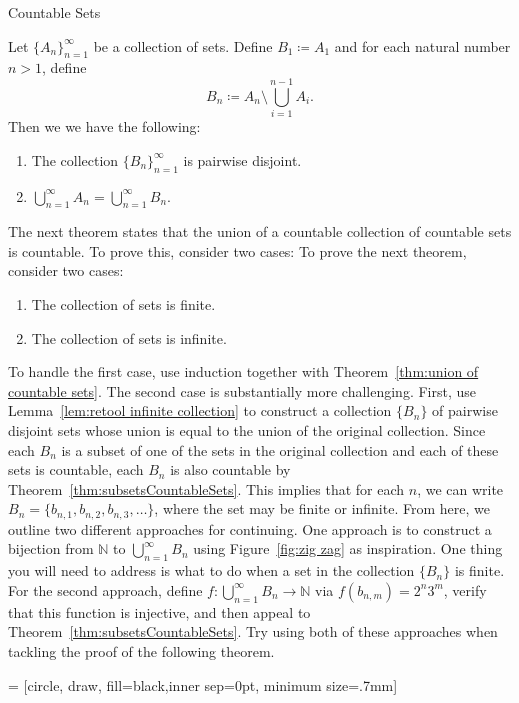 \begin{section}{Countable Sets}
\begin{lemma}\label{lem:retool infinite collection}
Let $\{A_n\}_{n=1}^{\infty}$ be a collection of sets. Define $B_1\coloneqq A_1$ and for each natural number $n>1$, define
\[
B_n\coloneqq A_n\setminus \bigcup_{i=1}^{n-1}A_i.
\]
Then we we have the following:
\begin{enumerate}[label=\textrm{(\alph*)}]
\item The collection $\{B_n\}_{n=1}^{\infty}$ is pairwise disjoint.
\item $\displaystyle \bigcup_{n=1}^{\infty}A_n =\bigcup_{n=1}^{\infty}B_n$.
\end{enumerate}
\end{lemma}

The next theorem states that the union of a countable collection of countable sets is countable. To prove this, consider two cases:
To prove the next theorem, consider two cases:
\begin{enumerate}
\item The collection of sets is finite.  
\item The collection of sets is infinite.
\end{enumerate}
To handle the first case, use induction together with Theorem~\ref{thm:union of countable sets}. The second case is substantially more challenging.  First, use Lemma~\ref{lem:retool infinite collection} to construct a collection $\{B_n\}$ of pairwise disjoint sets whose union is equal to the union of the original collection. Since each $B_n$ is a subset of one of the sets in the original collection and each of these sets is countable, each $B_n$ is also countable by Theorem~\ref{thm:subsetsCountableSets}. This implies that for each $n$, we can write $B_n=\{b_{n,1}, b_{n,2},b_{n,3},\ldots\}$, where the set may be finite or infinite. From here, we outline two different approaches for continuing.  One approach is to construct a bijection from $\mathbb{N}$ to $\bigcup_{n=1}^{\infty}B_n$ using Figure~\ref{fig:zig zag} as inspiration.  One thing you will need to address is what to do when a set in the collection $\{B_n\}$ is finite. For the second approach, define $f:\bigcup_{n=1}^{\infty}B_n\to \mathbb{N}$ via $f(b_{n,m})=2^n3^m$, verify that this function is injective, and then appeal to Theorem~\ref{thm:subsetsCountableSets}.  Try using both of these approaches when tackling the proof of the following theorem.

 = [circle, draw, fill=black,inner sep=0pt, minimum size=.7mm]


\end{section}
